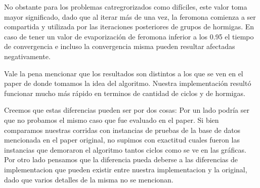 \documentclass[a4paper,spanish]{article}
\begin{document}
No obstante para los problemas catregrorizados como difíciles, este valor toma mayor significado, dado que al iterar más 
de una vez, la feromona comienza a ser compartida y utilizada por las iteraciones posteriores de grupos
de hormigas. En caso de tener un valor de evaporización de feromona inferior a los 0.95 el tiempo de
convergencia e incluso la convergencia misma pueden resultar afectadas negativamente.

Vale la pena mencionar que los resultados son distintos a los que se ven en el paper de donde tomamos
la idea del algoritmo. Nuestra implementación resultó funcionar mucho más rápido en terminos de cantidad
de ciclos y de hormigas.

Creemos que estas diferencias pueden ser por dos cosas: 
Por un lado podría ser que no probamos el mismo caso que fue evaluado en el paper. Si bien comparamos nuestras
corridas con instancias de pruebas de la base de datos mencionada en el paper original, no supimos con exactitud 
cuales fueron las instancias que demoraron el algoritmo tantos ciclos como se ve en las gráficas.
Por otro lado pensamos que la diferencia pueda deberse a las diferencias de implementacion que pueden existir
entre nuestra implementacion y la original, dado que varios detalles de la misma no se mencionan.


\clearpage


\end{document}
